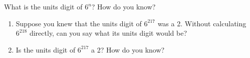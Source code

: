\documentclass{book}
\begin{document}
\setcounter{project}{22}
\addtocounter{project}{-1}
\begin{activity}[]\label{activity-17}
\hypertarget{p-238}{}%
What is the units digit of \(6^n\)?  How do you know?%
\begin{enumerate}[font=\bfseries,label=(\alph*),ref=\alph*]
\item\label{task-26} \hypertarget{p-239}{}%
Suppose you knew that the units digit of \(6^{217}\) was a 2.  Without calculating \(6^{218}\) directly, can you say what its units digit would be?%
\item\label{task-27} \hypertarget{p-240}{}%
Is the units digit of \(6^{217}\) a 2?  How do you know?%
\end{enumerate}
\end{activity}

\clearpage
\end{document}
